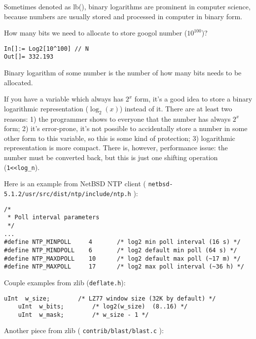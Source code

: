 
Sometimes denoted as lb(), binary logarithms are prominent in computer science, 
because numbers are usually stored and processed in computer in binary form.

\leveldown{}


How many bits we need to allocate to store googol number ($10^{100}$)?

\begin{lstlisting}[caption=Wolfram Mathematica]
In[]:= Log2[10^100] // N
Out[]= 332.193
\end{lstlisting}

Binary logarithm of some number is the number of how many bits needs to be allocated.

If you have a variable which always has $2^x$ form, it's a good idea to store a binary logarithmic representation ($\log_2 (x)$) instead of it.
There are at least two reasons:
1) the programmer shows to everyone that the number has always $2^x$ form;
2) it's error-prone, it's not possible to accidentally store a number in some other form to this variable, so this is some kind of protection;
3) logarithmic representation is more compact.
There is, however, performance issue: the number must be converted back, but this is just one shifting operation (\texttt{1<<log\_n}).

Here is an example from NetBSD NTP client ( \texttt{netbsd-5.1.2/usr/src/dist/ntp/include/ntp.h} ):

\begin{lstlisting}[caption=C code]
/*
 * Poll interval parameters
 */
...
#define NTP_MINPOLL     4       /* log2 min poll interval (16 s) */
#define NTP_MINDPOLL    6       /* log2 default min poll (64 s) */
#define NTP_MAXDPOLL    10      /* log2 default max poll (~17 m) */
#define NTP_MAXPOLL     17      /* log2 max poll interval (~36 h) */
\end{lstlisting}

Couple examples from zlib (\texttt{deflate.h}):

\begin{lstlisting}[caption=C code]
    uInt  w_size;        /* LZ77 window size (32K by default) */
    uInt  w_bits;        /* log2(w_size)  (8..16) */
    uInt  w_mask;        /* w_size - 1 */
\end{lstlisting}

Another piece from zlib ( \texttt{contrib/blast/blast.c} ):

